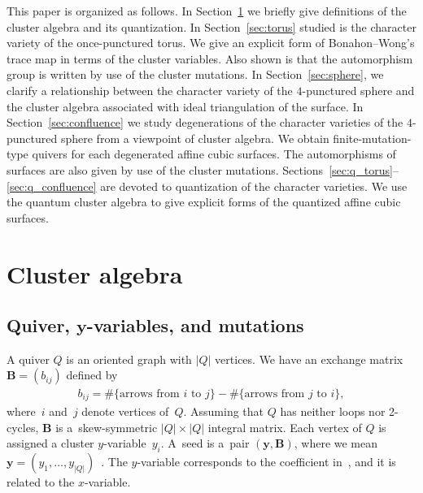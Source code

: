 \documentclass[10pt,a4paper]{amsart}
\numberwithin{equation}{section}
\begin{document}
This paper is organized as follows. In Section~\ref{sec:cluster} we briefly give definitions of the cluster algebra and its quantization. In Section~\ref{sec:torus} studied is the character variety of the once-punctured torus. We give an explicit form of Bonahon--Wong's trace map in terms of the cluster variables. Also shown is that the automorphism group is written by use of the cluster mutations. In Section~\ref{sec:sphere}, we clarify a relationship between the character variety of the $4$-punctured sphere and the cluster algebra associated with ideal triangulation of the surface. In Section~\ref{sec:confluence} we study degenerations of the character varieties of the $4$-punctured sphere from a viewpoint of cluster algebra. We obtain finite-mutation-type quivers for each degenerated affine cubic surfaces. The automorphisms of surfaces are also given by use of the cluster mutations. Sections~\ref{sec:q_torus}--\ref{sec:q_confluence} are devoted to quantization of the character varieties. We use the quantum cluster algebra to give explicit forms of the quantized affine cubic surfaces.

\section{Cluster algebra} \label{sec:cluster}
\subsection[Quiver, $y$-variables, and mutations]{Quiver, $\boldsymbol{y}$-variables, and mutations}
A quiver $Q$ is an oriented graph with $|Q|$ vertices. We have an exchange matrix $\mathbf{B} = (b_{ij})$ defined by
\begin{gather*}
 b_{ij}= \#\{ \text{arrows from $i$ to $j$}\} - \# \{ \text{arrows from $j$ to $i$} \} ,
\end{gather*}
where~$i$ and~$j$ denote vertices of~$Q$. Assuming that $Q$ has neither loops nor 2-cycles, $\mathbf{B}$ is a~skew-symmetric $|Q|\times |Q|$ integral matrix. Each vertex of $Q$ is assigned a cluster $y$-variable~$y_i$. A~seed is a~pair $(\boldsymbol{y}, \mathbf{B})$, where we mean $\boldsymbol{y}=(y_1, \dots, y_{|Q|})$~\cite{FominZelev02a}. The $y$-variable corresponds to the coefficient in~\cite{FominZelev02a}, and it is related to the $x$-variable.
\end{document}
